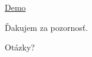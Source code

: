 \documentclass[10pt]{beamer}
\begin{document}

\begin{frame}[standout]
\thispagestyle{empty}
  {\huge \href{https://www.youtube.com/watch?v=YwKIwoqVeJs}{Demo} \\}
\end{frame}


\begin{frame}[standout]
\thispagestyle{empty}
  {\huge Ďakujem za pozornosť. \\}

  \vspace{2cm}

  {\huge Otázky? \\}
\end{frame}


\appendix

\end{document}
